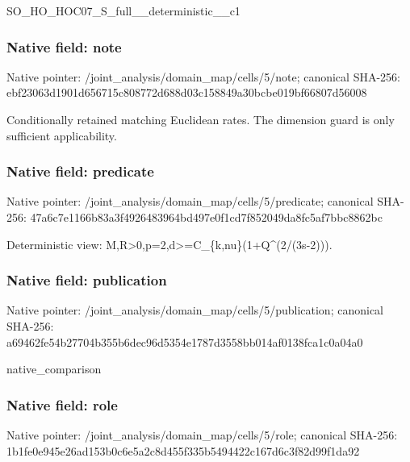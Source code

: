 \documentclass[10pt,a4paper]{article}
\begin{document}
\begingroup\raggedright\sloppy SO\_\allowbreak{}HO\_\allowbreak{}HOC07\_\allowbreak{}S\_\allowbreak{}full\_\allowbreak{}\_\allowbreak{}deterministic\_\allowbreak{}\_\allowbreak{}c1\par\endgroup

\subsubsection{Native field: note}
Native pointer: /joint\_\allowbreak{}analysis/domain\_\allowbreak{}map/cells/5/note; canonical SHA-256: ebf23063d1901d656715c808772d688d03c158849a30bcbe019bf66807d56008

\begingroup\raggedright\sloppy Conditionally retained matching Euclidean rates. The dimension guard is only sufficient applicability.\par\endgroup

\subsubsection{Native field: predicate}
Native pointer: /joint\_\allowbreak{}analysis/domain\_\allowbreak{}map/cells/5/predicate; canonical SHA-256: 47a6c7e1166b83a3f4926483964bd497e0f1cd7f852049da8fc5af7bbc8862bc

\begingroup\raggedright\sloppy Deterministic view:\allowbreak{} M,\allowbreak{}R>0,\allowbreak{}p=\allowbreak{}2,\allowbreak{}d>=\allowbreak{}C\_\allowbreak{}\{k,\allowbreak{}nu\}(1+Q\textasciicircum{}(2/\allowbreak{}(3s-2))).\par\endgroup

\subsubsection{Native field: publication}
Native pointer: /joint\_\allowbreak{}analysis/domain\_\allowbreak{}map/cells/5/publication; canonical SHA-256: a69462fe54b27704b355b6dec96d5354e1787d3558bb014af0138fca1c0a04a0

\begingroup\raggedright\sloppy native\_\allowbreak{}comparison\par\endgroup

\subsubsection{Native field: role}
Native pointer: /joint\_\allowbreak{}analysis/domain\_\allowbreak{}map/cells/5/role; canonical SHA-256: 1b1fe0e945e26ad153b0c6e5a2c8d455f335b5494422c167d6c3f82d99f1da92
\end{document}
